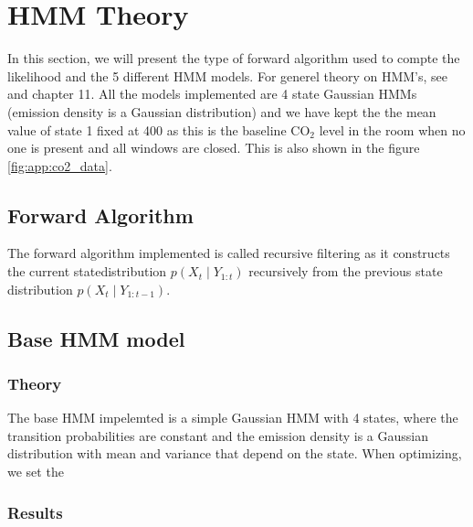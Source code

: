 \section{HMM Theory}
In this section, we will present the type of forward algorithm used to compte the likelihood 
and the 5 different HMM models. 
For generel theory on HMM's, see \cite{zucchini2016hidden} and \cite{moler2024statistical} chapter 11. 
All the models implemented are 4 state Gaussian HMMs (emission density is a Gaussian distribution) 
and we have kept the the mean value of state 1 fixed at 400 as this is the baseline $\text{CO}_2$ level in the room 
when no one is present and all windows are closed. This is also shown in the figure \ref{fig:app:co2_data}. 

\subsection{Forward Algorithm} 
The forward algorithm implemented is called recursive filtering 
\cite{moler2024statistical} as it constructs the current 
statedistribution $p(X_t \mid Y_{1:t})$ recursively from the previous 
state distribution $p(X_t \mid Y_{1:t-1})$.


\subsection{Base HMM model}
\subsubsection{Theory}
The base HMM impelemted is a simple Gaussian HMM with 4 states, where 
the transition probabilities are constant and the emission density 
is a Gaussian distribution with mean and variance that depend on 
the state. When optimizing, we set the 
\subsubsection{Results}

